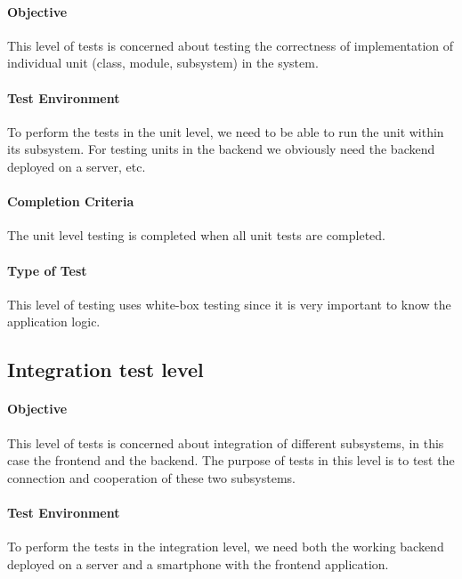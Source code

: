 \documentclass[11pt]{book}
\begin{document}
\paragraph{Objective}

This level of tests is concerned about testing the correctness of implementation of individual unit (class, module, subsystem) in the system.

\paragraph{Test Environment}

To perform the tests in the unit level, we need to be able to run the unit within its subsystem. For testing units in the backend we obviously need the backend deployed on a server, etc.

\paragraph{Completion Criteria}

The unit level testing is completed when all unit tests are completed.

\paragraph{Type of Test}

This level of testing uses white-box testing since it is very important to know the application logic.


\subsection{Integration test level}

\paragraph{Objective}

This level of tests is concerned about integration of different subsystems, in this case the frontend and the backend. The purpose of tests in this level is to test the connection and cooperation of these two subsystems.

\paragraph{Test Environment}

To perform the tests in the integration level, we need both the working backend deployed on a server and a smartphone with the frontend application.
\end{document}
